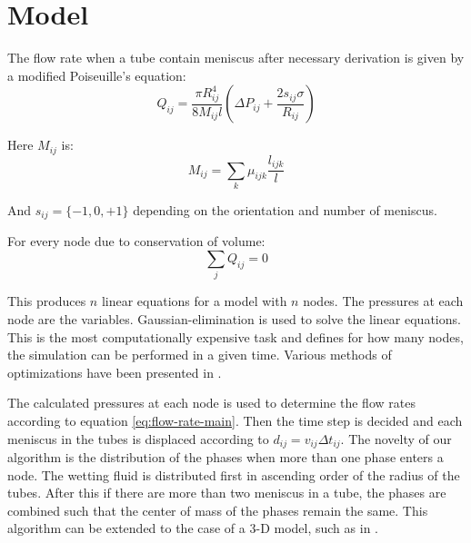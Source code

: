 \documentclass[11pt]{article}
\begin{document}
	\section*{Model}		
		The flow rate when a tube contain meniscus after necessary derivation is given by a modified Poiseuille's equation:
		\begin{equation} \label{eq:flow-rate-main}
			Q_{ij} = \frac{\pi R_{ij}^4}{8M_{ij}l} \left(\Delta P_{ij} + \frac{2s_{ij}\sigma}{R_{ij}} \right)
		\end{equation}
		
		Here $M_{ij}$ is:
		\begin{equation}
			{M}_{ij} = \sum_{k} {\mu}_{ijk} \frac{l_{ijk}}{l}
		\end{equation}
		
		And 
		$s_{ij} = \{-1, 0, +1\}$ depending on the orientation and number of meniscus.
		
		For every node due to conservation of volume:
		\begin{equation}
			\sum_j Q_{ij} = 0
		\end{equation}
		
		This produces $n$ linear equations for a model with $n$ nodes. The pressures at each node are the variables. Gaussian-elimination is used to solve the linear equations. This is the most computationally expensive task and defines for how many nodes, the simulation can be performed in a given time. Various methods of optimizations have been presented in \cite{bib4}.
	
	The calculated pressures at each node is used to determine the flow rates according to equation \ref{eq:flow-rate-main}. Then the time step is decided and each meniscus in the tubes is displaced according to $d_{ij} = v_{ij} \Delta t_{ij}$. The novelty of our algorithm is the distribution of the phases when more than one phase enters a node. The wetting fluid is distributed first in ascending order of the radius of the tubes. After this if there are more than two meniscus in a tube, the phases are combined such that the center of mass of the phases remain the same. This algorithm can be extended to the case of a 3-D model, such as in \cite{bib2}.
		
\end{document}

